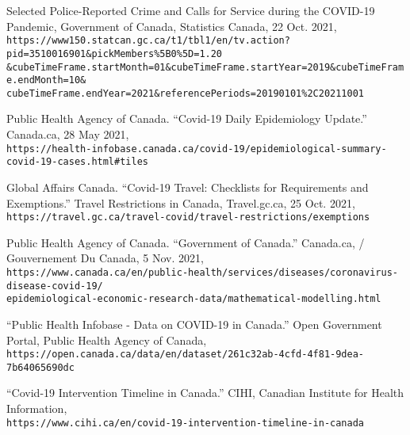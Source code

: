 \documentclass[fontsize=11pt]{article}
\newcommand{\quotes}[1]{``#1''}
\begin{document}
\begin{thebibliography}{9}
	Selected Police-Reported Crime and Calls for Service during the COVID-19 Pandemic, Government of Canada, Statistics Canada, 22 Oct. 2021, \\
	\verb+https://www150.statcan.gc.ca/t1/tbl1/en/tv.action?pid=3510016901&pickMembers%5B0%5D=1.20+\\
	\verb+&cubeTimeFrame.startMonth=01&cubeTimeFrame.startYear=2019&cubeTimeFrame.endMonth=10&+\\
	\verb+cubeTimeFrame.endYear=2021&referencePeriods=20190101%2C20211001+

	Public Health Agency of Canada. \quotes{Covid-19 Daily Epidemiology Update.} Canada.ca, 28 May 2021,\\
	\verb+https://health-infobase.canada.ca/covid-19/epidemiological-summary-covid-19-cases.html#tiles+

	Global Affairs Canada. \quotes{Covid-19 Travel: Checklists for Requirements and Exemptions.} Travel Restrictions in Canada,  Travel.gc.ca, 25 Oct. 2021,\\
	\verb+https://travel.gc.ca/travel-covid/travel-restrictions/exemptions+

	Public Health Agency of Canada. \quotes{Government of Canada.} Canada.ca, / Gouvernement Du Canada, 5 Nov. 2021,\\
	\verb+https://www.canada.ca/en/public-health/services/diseases/coronavirus-disease-covid-19/+\\
	\verb+epidemiological-economic-research-data/mathematical-modelling.html+

	\quotes{Public Health Infobase - Data on COVID-19 in Canada.} Open Government Portal, Public Health Agency of Canada,\\
	\verb+https://open.canada.ca/data/en/dataset/261c32ab-4cfd-4f81-9dea-7b64065690dc+

	\quotes{Covid-19 Intervention Timeline in Canada.} CIHI, Canadian Institute for Health Information,\\
	\verb+https://www.cihi.ca/en/covid-19-intervention-timeline-in-canada+



\end{thebibliography}
\end{document}
